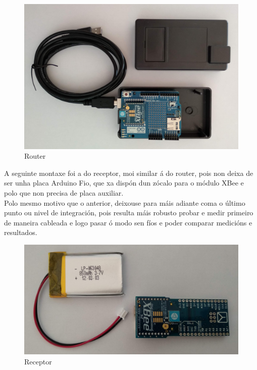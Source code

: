   \begin{figure}[htbp]
    \centering
    \includegraphics[scale=0.15,keepaspectratio=true]{./imagenes/router.jpg}
    \caption{Router}
    \label{figura:Router}
   \end{figure}
   
   A seguinte montaxe foi a do receptor, moi similar á do router, pois non deixa
   de ser unha placa Arduino Fio, que xa dispón dun zócalo para o módulo XBee e
   polo que non precisa de placa auxiliar. \\
   
   Polo mesmo motivo que o anterior, deixouse para máis adiante coma o último
   punto ou nivel de integración, pois resulta máis robusto probar e medir
   primeiro de maneira cableada e logo pasar ó modo sen fíos e poder comparar
   medicións e resultados. \\
  
   \begin{figure}[htbp]
    \centering
    \includegraphics[scale=0.15,keepaspectratio=true]{./imagenes/receptor.jpg}
    \caption{Receptor}
    \label{figura:Receptor}
   \end{figure}
   
